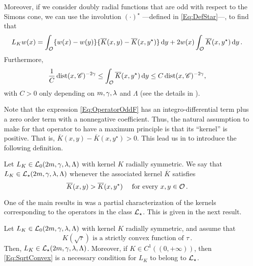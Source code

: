 Moreover, if we consider doubly radial functions that are odd with respect to the Simons cone, we can use the involution $(\cdot)^\star$ ---defined in \eqref{Eq:DefStar}---, to find that
\begin{equation}
\label{Eq:OperatorOddF}
L_K w (x) = \int_{\mathcal{O}} \{w(x) - w(y) \} \{\overline{K}(x, y) - \overline{K}(x, y^\star)  \} \,\mathrm{d} y +  2 w(x) \int_{\mathcal{O}} \overline{K}(x, y^\star) \,\mathrm{d} y \,.
\end{equation}
Furthermore,
\begin{equation}
\label{Eq:ZeroOrderTerm}
\frac{1}{C} \operatorname{dist}(x,\mathscr{C})^{-2\gamma} \leq \int_{\mathcal{O}} \overline{K}(x, y^\star) \,\mathrm{d} y \leq C \operatorname{dist}(x,\mathscr{C})^{-2\gamma},
\end{equation}
with $C>0$ only depending on $m, \gamma, \lambda$ and $\Lambda$ (see the details in \cite{FelipeSanz-Perela:IntegroDifferentialI}).


Note that the expression \eqref{Eq:OperatorOddF} has an integro-differential term plus a zero order term with a nonnegative coefficient. Thus, the natural assumption to make for that operator to have a maximum principle is that its ``kernel'' is positive. That is, $\overline{K}(x, y) - \overline{K}(x, y^\star)>0$. This lead us in \cite{FelipeSanz-Perela:IntegroDifferentialI} to introduce the following definition.

\begin{definition}
	Let $L_K \in \mathcal{L}_0(2m,\gamma,\lambda, \Lambda)$ with kernel $K$ radially symmetric. We say that $L_K\in \mathcal{L}_\star (2m,\gamma,\lambda, \Lambda)$ whenever the associated kernel $\overline{K}$ satisfies
	\begin{equation}
	\label{Eq:KernelInequality}
	\overline{K}(x,y) > \overline{K}(x, y^\star) \quad \text{ for every }x,y \in \mathcal{O}\,.
	\end{equation}
\end{definition}

One of the main results in \cite{FelipeSanz-Perela:IntegroDifferentialI} was a partial characterization of the kernels corresponding to the operators in the class $\mathcal{L}_\star$. This is given in the next result.

\begin{theorem}
	\label{Th:CharacterizationLstar}
	Let $L_K \in \mathcal{L}_0(2m,\gamma,\lambda, \Lambda)$ with kernel $K$ radially symmetric, and assume that 
	\begin{equation}
	\label{Eq:SqrtConvex}	
	K(\sqrt{\tau}) \text{ is a strictly convex function of }\tau\,.
	\end{equation}
	Then, $L_K\in \mathcal{L}_\star(2m,\gamma,\lambda, \Lambda)$. Moreover, if $K\in C^1((0,+\infty))$, then \eqref{Eq:SqrtConvex} is a necessary condition for $L_K$ to belong to $\mathcal{L}_\star$.
\end{theorem}

